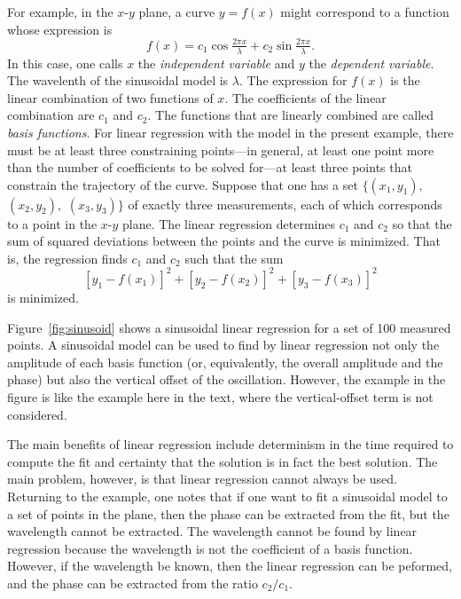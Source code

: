 \documentclass[twocolumn]{article}
\begin{document}
For example, in the $x$-$y$ plane, a curve $y = f(x)$ might correspond to a
function whose expression is
\begin{equation}
   f(x) = c_1 \cos\tfrac{2\pi x}{\lambda} + c_2 \sin\tfrac{2\pi x}{\lambda}.
\end{equation}
In this case, one calls $x$ the \emph{independent variable} and $y$ the
\emph{dependent variable}.  The wavelenth of the sinusoidal model is $\lambda$.
The expression for $f(x)$ is the linear combination of two functions of $x$.
The coefficients of the linear combination are $c_1$ and $c_2$.  The functions
that are linearly combined are called \emph{basis functions}.  For linear
regression with the model in the present example, there must be at least three
constraining points---in general, at least one point more than the number of
coefficients to be solved for---at least three points that constrain the
trajectory of the curve.  Suppose that one has a set $\{(x_1, y_1),$ $(x_2,
y_2),$ $(x_3, y_3)\}$ of exactly three measurements, each of which corresponds
to a point in the $x$-$y$ plane.  The linear regression determines $c_1$ and
$c_2$ so that the sum of squared deviations between the points and the curve is
minimized.  That is, the regression finds $c_1$ and $c_2$ such that the sum
\begin{equation}
   \left[y_1 - f(x_1)\right]^2 + \left[y_2 - f(x_2)\right]^2 + \left[y_3 -
   f(x_3)\right]^2
\end{equation}
is minimized.

Figure~\ref{fig:sinusoid} shows a sinusoidal linear regression for a set of 100
measured points. A sinusoidal model can be used to find by linear regression
not only the amplitude of each basis function (or, equivalently, the overall
amplitude and the phase) but also the vertical offset of the oscillation.
However, the example in the figure is like the example here in the text, where
the vertical-offset term is not considered.

The main benefits of linear regression include determinism in the time required
to compute the fit and certainty that the solution is in fact the best
solution. The main problem, however, is that linear regression cannot always be
used.  Returning to the example, one notes that if one want to fit a sinusoidal
model to a set of points in the plane, then the phase can be extracted from the
fit, but the wavelength cannot be extracted. The wavelength cannot be found by
linear regression because the wavelength is not the coefficient of a basis
function.  However, if the wavelength be known, then the linear regression can
be peformed, and the phase can be extracted from the ratio $c_2/c_1$.
\end{document}
